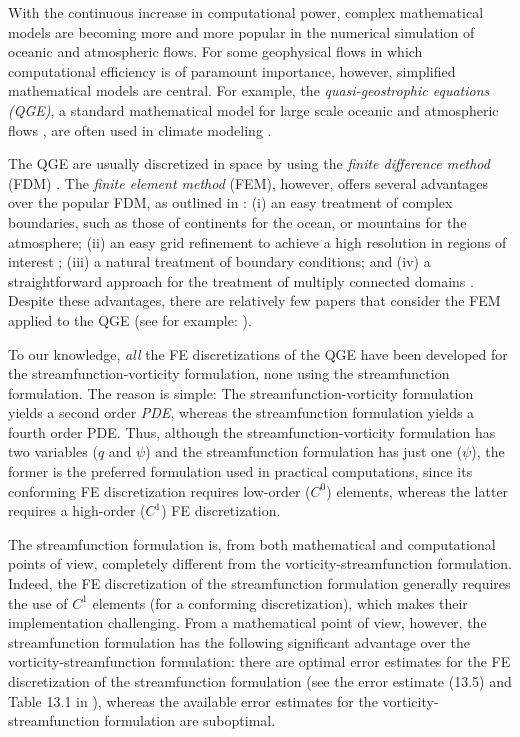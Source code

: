 With the continuous increase in computational power, complex mathematical models
are becoming more and more popular in the numerical simulation of oceanic and
atmospheric flows. For some geophysical flows in which computational efficiency
is of paramount importance, however, simplified mathematical models are central.
For example, the \emph{quasi-geostrophic equations (QGE)}, a standard
mathematical model for large scale oceanic and atmospheric flows
\cite{Cushman11,Majda,Pedlosky92,Vallis06}, are often used in climate modeling
\cite{Dijkstra05}.

The QGE are usually discretized in space by using the \emph{finite difference
method} (FDM) \cite{San11}. The \emph{finite element method} (FEM), however,
offers several advantages over the popular FDM, as outlined in \cite{Myers}: (i)
an easy treatment of complex boundaries, such as those of continents for the
ocean, or mountains for the atmosphere; (ii) an easy grid refinement to achieve
a high resolution in regions of interest \cite{Cascon}; (iii) a natural
treatment of boundary conditions; and (iv) a straightforward approach for the
treatment of multiply connected domains \cite{Myers}. Despite these advantages,
there are relatively few papers that consider the FEM applied to the QGE (see
for example: \cite{Cascon, Fix, LeProvost94, Myers, Stevens82}).

To our knowledge, \emph{all} the FE discretizations of the QGE have been
developed for the streamfunction-vorticity formulation, none using the
streamfunction formulation. The reason is simple: The streamfunction-vorticity
formulation yields a second order \emph{PDE}, whereas the streamfunction
formulation yields a fourth order PDE. Thus, although the
streamfunction-vorticity formulation has two variables ($q$ and $\psi$) and the
streamfunction formulation has just one ($\psi$), the former is the preferred
formulation used in practical computations, since its conforming FE
discretization requires low-order ($C^0$) elements, whereas the latter requires
a high-order ($C^1$) FE discretization.

The streamfunction formulation is, from both mathematical and computational
points of view, completely different from the vorticity-streamfunction
formulation. Indeed, the FE discretization of the streamfunction formulation
generally requires the use of $C^1$ elements (for a conforming discretization),
which makes their implementation challenging. From a mathematical point of view,
however, the streamfunction formulation has the following significant advantage
over the vorticity-streamfunction formulation: there are optimal error estimates
for the FE discretization of the streamfunction formulation (see the error
estimate (13.5) and Table 13.1 in \cite{Gunzburger89}), whereas the available
error estimates for the vorticity-streamfunction formulation are suboptimal.


